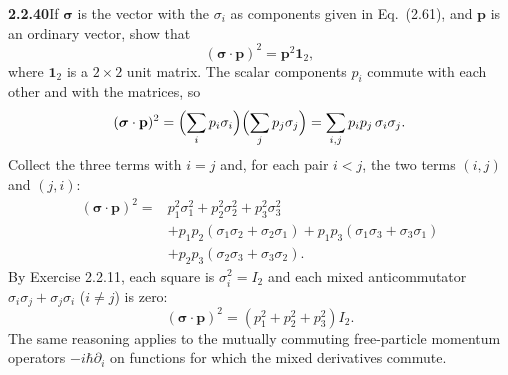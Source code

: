 \par\bigskip
\noindent\textbf{2.2.40}\quad If $\boldsymbol{\sigma}$ is the vector with the
$\sigma_{i}$ as components given in Eq.~(2.61), and $\mathbf{p}$ is an ordinary
vector, show that
\[
(\boldsymbol{\sigma}\cdot\mathbf{p})^{2}=\mathbf{p}^{2}\mathbf{1}_{2},
\]
where $\mathbf{1}_{2}$ is a $2\times2$ unit matrix.
\solution
{}
The scalar components $p_i$ commute with each other and with the
matrices, so
\[
(\boldsymbol{\sigma}\cdot\mathbf p)^2
=\Bigl(\sum_ip_i\sigma_i\Bigr)\Bigl(\sum_jp_j\sigma_j\Bigr)
=\sum_{i,j}p_ip_j\,\sigma_i\sigma_j.
\]
Collect the three terms with $i=j$ and, for each pair $i<j$, the
two terms $(i,j)$ and $(j,i)$:
\[
\begin{aligned}
(\boldsymbol{\sigma}\cdot\mathbf p)^2
={}&p_1^2\sigma_1^2+p_2^2\sigma_2^2+p_3^2\sigma_3^2\\
&+p_1p_2(\sigma_1\sigma_2+\sigma_2\sigma_1)
+p_1p_3(\sigma_1\sigma_3+\sigma_3\sigma_1)\\
&+p_2p_3(\sigma_2\sigma_3+\sigma_3\sigma_2).
\end{aligned}
\]
By Exercise 2.2.11, each square is $\sigma_i^2=I_2$ and each mixed
anticommutator $\sigma_i\sigma_j+\sigma_j\sigma_i$ ($i\ne j$) is zero:
\[
\boxed{(\boldsymbol{\sigma}\cdot\mathbf p)^2
=(p_1^2+p_2^2+p_3^2)I_2}.
\]
The same reasoning applies to the mutually commuting free-particle
momentum operators $-i\hbar\partial_i$ on functions for which the mixed
derivatives commute.

